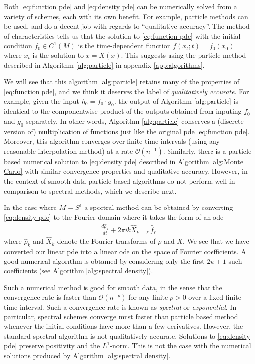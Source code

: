 \documentclass[12pt]{amsart}
\begin{document}
Both \eqref{eq:function pde} and \eqref{eq:density pde} can be numerically solved from a variety of schemes, each with its own benefit.
For example, particle methods can be used, and do a decent job with regards to ``qualitative accuracy''.
The method of characteristics tells us that
the solution to \eqref{eq:function pde} with the initial condition $f_{0} \in C^{1}(M)$ is the time-dependent function $f( x_{t} ;t) = f_{0}( x_{0} )$ where $x_{t}$ is the solution to $\dot{x} = X(x)$.
This suggests using the particle method described in Algorithm \ref{alg:particle} in appendix \ref{app:algorithms}.
 
We will see that this algorithm \eqref{alg:particle} retains many of the properties of \eqref{eq:function pde},
and we think it deserves the label of \emph{qualitatively accurate}.
For example, given the input $h_{0} = f_{0} \cdot g_{0}$, the output of Algorithm \ref{alg:particle} is identical to the componentwise product of the outputs obtained from inputing $f_{0}$ and $g_{0}$ separately.
In other words, Algorithm \ref{alg:particle} conserves a (discrete version of) multiplication of functions just like the original pde \eqref{eq:function pde}.
Moreover, this algorithm converges over finite time-intervals (using any reasonable interpolation method) at a rate $\mathcal{O}(n^{-1})$.
Similarly, there is a particle based numerical solution to \eqref{eq:density pde} described in Algorithm \ref{alg:Monte Carlo} with similar convergence properties and qualitative accuracy.
However, in the context of smooth data particle based algorithms do not perform well in comparison to spectral methods, which we describe next.

In the case where $M=S^{1}$ a spectral method can be obtained by converting \eqref{eq:density pde} to the Fourier domain where it takes the form
of an ode
\begin{align}
	\frac{d \hat{\rho}_{k}}{dt} + 2\pi i k  \widehat{X}_{k-\ell} \hat{f}_{\ell} \label{eq:standard spectral}
\end{align}
where $\hat{\rho}_{k}$ and $\widehat{X}_{k}$ denote the Fourier transforms of $\rho$ and $X$.
We see that we have converted our linear pde into a linear ode on the space of Fourier coefficients.
A good numerical algorithm is obtained by considering only the first $2n+1$ such coefficients (see Algorithm \ref{alg:spectral density}).

Such a numerical method is good for smooth data, in the sense that the convergence rate is faster than $\mathcal{O}(n^{-p})$ for any finite $p > 0$ over a fixed finite time interval.
Such a convergence rate is known as \emph{spectral} or \emph{exponential}.
In particular, spectral schemes converge must faster than particle based method whenever the initial conditions have more than a few derivatives.
However, the standard spectral algorithm is not qualitatively accurate.
Solutions to \eqref{eq:density pde} preserve positivity and the $L^{1}$-norm.  This is not the case with the numerical solutions produced by Algorithm \ref{alg:spectral density}.
\end{document}
